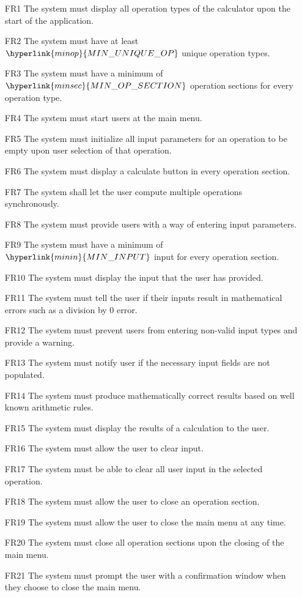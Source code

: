 \documentclass[12pt, titlepage]{article}
\begin{document}
\begin{enumerate}

\item [FR1] The system must display all operation types of the calculator upon the start of the application.
\item [FR2] The system must have at least $\hyperlink{minop}{MIN\_UNIQUE\_OP}$ unique operation types.
\item [FR3] The system must have a minimum of $\hyperlink{minsec}{MIN\_OP\_SECTION}$ operation sections for every operation type.
\item [FR4] The system must start users at the main menu.
\item [FR5] The system must initialize all input parameters for an operation to be empty upon user selection of that operation.
\item [FR6] The system must display a calculate button in every operation section.
\item [FR7] The system shall let the user compute multiple operations synchronously.
\item [FR8] The system must provide users with a way of entering input parameters.
\item [FR9] The system must have a minimum of $\hyperlink{minin}{MIN\_INPUT}$ input for every operation section.
\item [FR10] The system must display the input that the user has provided.
\item [FR11] The system must tell the user if their inputs result in mathematical errors such as a division by 0 error.
\item [FR12] The system must prevent users from entering non-valid input types and provide a warning.
\item [FR13] The system must notify user if the necessary input fields are not populated.
\item [FR14] The system must produce mathematically correct results based on well known arithmetic rules.
\item [FR15] The system must display the results of a calculation to the user.
\item [FR16] The system must allow the user to clear input.
\item [FR17] The system must be able to clear all user input in the selected operation.
\item [FR18] The system must allow the user to close an operation section.
\item [FR19] The system must allow the user to close the main menu at any time.
\item [FR20] The system must close all operation sections upon the closing of the main menu.
\item [FR21] The system must prompt the user with a confirmation window when they choose to close the main menu.

\end{enumerate}
\end{document}
